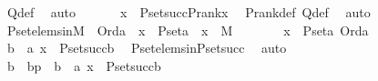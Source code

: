 \begin{isabellebody}
\ Q{\isacharunderscore}{\kern0pt}def\ \isamarkupfalse%
\ auto\ \isanewline
\ \ \isamarkupfalse%
\ \isamarkupfalse%
\ {\isachardoublequoteopen}x\ {\isasymin}\ P{\isacharunderscore}{\kern0pt}set{\isacharparenleft}{\kern0pt}succ{\isacharparenleft}{\kern0pt}P{\isacharunderscore}{\kern0pt}rank{\isacharparenleft}{\kern0pt}x{\isacharparenright}{\kern0pt}{\isacharparenright}{\kern0pt}{\isacharparenright}{\kern0pt}{\isachardoublequoteclose}\ \isamarkupfalse%
\ P{\isacharunderscore}{\kern0pt}rank{\isacharunderscore}{\kern0pt}def\ Q{\isacharunderscore}{\kern0pt}def\ \isamarkupfalse%
\ auto\ \isanewline
{}\isamarkupfalse%
%
\endisatagproof
{\isafoldproof}%
%
\isadelimproof
\isanewline
%
\endisadelimproof
\isanewline
{}\isamarkupfalse%
\ P{\isacharunderscore}{\kern0pt}set{\isacharunderscore}{\kern0pt}elems{\isacharunderscore}{\kern0pt}in{\isacharunderscore}{\kern0pt}M\ {\isacharcolon}{\kern0pt}\ {\isachardoublequoteopen}Ord{\isacharparenleft}{\kern0pt}a{\isacharparenright}{\kern0pt}\ {\isasymLongrightarrow}\ x\ {\isasymin}\ P{\isacharunderscore}{\kern0pt}set{\isacharparenleft}{\kern0pt}a{\isacharparenright}{\kern0pt}\ {\isasymLongrightarrow}\ x\ {\isasymin}\ M{\isachardoublequoteclose}\ \isanewline
%
\isadelimproof
%
\endisadelimproof
%
\isatagproof
{}\isamarkupfalse%
\ {\isacharminus}{\kern0pt}\ \isanewline
\ \ \isamarkupfalse%
\ {\isachardoublequoteopen}x\ {\isasymin}\ P{\isacharunderscore}{\kern0pt}set{\isacharparenleft}{\kern0pt}a{\isacharparenright}{\kern0pt}{\isachardoublequoteclose}\ {\isachardoublequoteopen}Ord{\isacharparenleft}{\kern0pt}a{\isacharparenright}{\kern0pt}{\isachardoublequoteclose}\isanewline
\ \ \isamarkupfalse%
\ \isamarkupfalse%
\ {\isachardoublequoteopen}{\isasymexists}b\ {\isacharless}{\kern0pt}\ a{\isachardot}{\kern0pt}\ x\ {\isasymin}\ P{\isacharunderscore}{\kern0pt}set{\isacharparenleft}{\kern0pt}succ{\isacharparenleft}{\kern0pt}b{\isacharparenright}{\kern0pt}{\isacharparenright}{\kern0pt}{\isachardoublequoteclose}\ \isamarkupfalse%
\ P{\isacharunderscore}{\kern0pt}set{\isacharunderscore}{\kern0pt}elems{\isacharunderscore}{\kern0pt}in{\isacharunderscore}{\kern0pt}P{\isacharunderscore}{\kern0pt}set{\isacharunderscore}{\kern0pt}succ\ \isamarkupfalse%
\ auto\ \isanewline
\ \ \isamarkupfalse%
\ \isamarkupfalse%
\ b\ \ bp\ {\isacharcolon}{\kern0pt}\ {\isachardoublequoteopen}b\ {\isacharless}{\kern0pt}\ a{\isachardoublequoteclose}\ {\isachardoublequoteopen}x\ {\isasymin}\ P{\isacharunderscore}{\kern0pt}set{\isacharparenleft}{\kern0pt}succ{\isacharparenleft}{\kern0pt}b{\isacharparenright}{\kern0pt}{\isacharparenright}{\kern0pt}{\isachardoublequoteclose}\ \isamarkupfalse%

\end{isabellebody}
